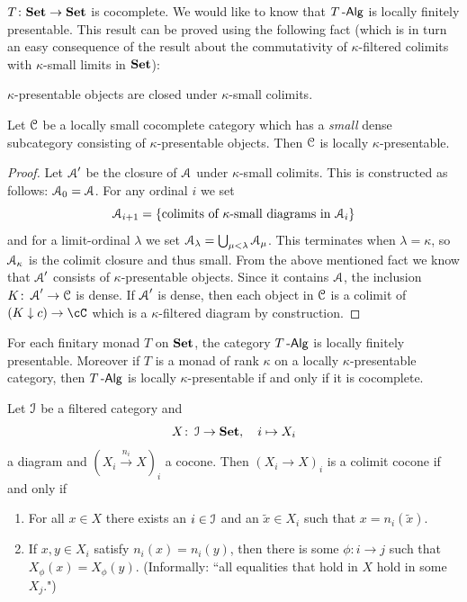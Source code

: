 \documentclass[a4paper,11pt,oneside,openany]{scrbook}
\begin{document}
$T\colon{\normalfont\textbf{Set}}\to{\normalfont\textbf{Set}}$ is cocomplete. We would like to know that $T\operatorname{-\mathsf{Alg}}$ is
locally finitely presentable. This result can be proved using the following fact
(which is in turn an easy consequence of the result about the commutativity of
$\kappa$-filtered colimits with $\kappa$-small limits in ${\normalfont\textbf{Set}}$):
\begin{center}
	$\kappa$-presentable objects are closed under $\kappa$-small colimits.
\end{center}
\begin{prop}
	Let $\operatorname{\mathcal{C}}$ be a locally small cocomplete category which has a \emph{small}
    dense subcategory consisting of $\kappa$-presentable objects. Then $\operatorname{\mathcal{C}}$ is
    locally $\kappa$-presentable.
\end{prop}
\begin{proof}
	Let $\operatorname{\mathcal{A}}'$ be the closure of $\operatorname{\mathcal{A}} $ under $ \kappa $-small  colimits.
	This is constructed as follows: $\operatorname{\mathcal{A}}_0 =\operatorname{\mathcal{A}} $.
	For any ordinal $ i $ we set
	\begin{displaymath}
		\operatorname{\mathcal{A}}_{i+1} = \{\text{colimits of $ \kappa $-small diagrams in $\operatorname{\mathcal{A}}_i $\}}
	\end{displaymath}
	and for a limit-ordinal $ \lambda $ we set $\operatorname{\mathcal{A}}_\lambda =
    \bigcup_{\mu<\lambda}\operatorname{\mathcal{A}}_{\mu} $.
	This terminates when $ \lambda = \kappa $, so $\operatorname{\mathcal{A}}_\kappa $ is the colimit
    closure and thus small.
	From the above mentioned fact we know that $\operatorname{\mathcal{A}}'  $ consists of $ \kappa
    $-presentable objects.
	Since it contains $\operatorname{\mathcal{A}} $, the inclusion $ K \colon\operatorname{\mathcal{A}}' \to \operatorname{\mathcal{C}} $ is dense.
	If $\operatorname{\mathcal{A}}' $ is dense, then each object in $ \operatorname{\mathcal{C}} $ is a colimit of $(K\downarrow
    c)\rightarrow\cC$ which is a $ \kappa $-filtered diagram by construction.
\end{proof}
\begin{cor}
	For each finitary monad $ T $ on $ {\normalfont\textbf{Set}} $, the category $ T\operatorname{-\mathsf{Alg}} $ is locally finitely presentable.
	Moreover if $ T $ is a monad of rank $ \kappa $ on a locally $ \kappa $-presentable category, then $ T\operatorname{-\mathsf{Alg}} $ is locally $ \kappa $-presentable if and only if it is cocomplete.
\end{cor}
\begin{thm}
	Let $ \operatorname{\mathcal{I}} $ be a filtered category and
	\begin{displaymath}
		X \colon \operatorname{\mathcal{I}} \to{\normalfont\textbf{Set}},\quad i \mapsto X_i
	\end{displaymath}
	a diagram and $ (X_i \xrightarrow{n_i} X)_i $ a cocone.
	Then $ (X_i \to X)_i $ is a colimit cocone if and only if
	\begin{enumerate}[label=\roman*)]
		\item For all $ x \in X $ there exists an $ i\in\operatorname{\mathcal{I}} $ and an $ \tilde x \in X_i $ such that $ x = n_i (\tilde x) $.
		\item If $ x , y \in X_i $ satisfy $ n_i(x) = n_i(y) $, then there is some $ \phi \colon i\to j $ such that $ X_\phi(x) = X_\phi(y) $.
		      (Informally: ``all equalities that hold in $ X $ hold in some $ X_j $.")
	\end{enumerate}
\end{thm}
\end{document}
